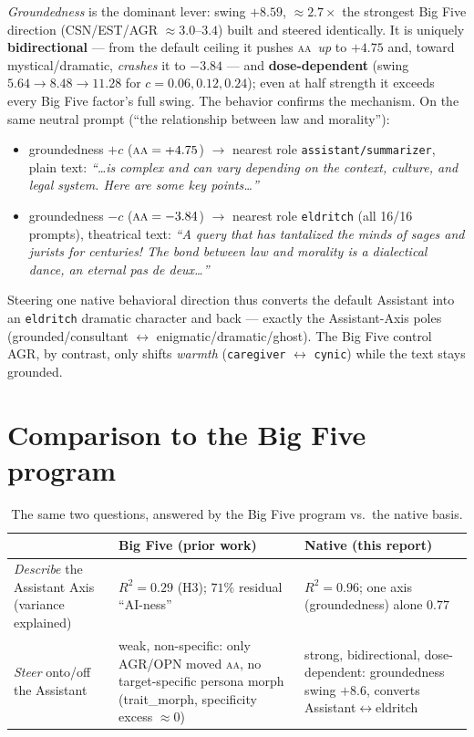 \documentclass[11pt]{article}
\renewcommand{\aa}{\textsc{aa}}
\newcommand{\R}{R^2}
\begin{document}
\emph{Groundedness} is the dominant lever: swing $+8.59$, $\approx 2.7\times$ the
strongest Big Five direction (CSN/EST/AGR $\approx 3.0$--$3.4$) built and steered
identically. It is uniquely \textbf{bidirectional} --- from the default ceiling it
pushes \aa\ \emph{up} to $+4.75$ and, toward mystical/dramatic, \emph{crashes} it to
$-3.84$ --- and \textbf{dose-dependent} (swing $5.64\!\to\!8.48\!\to\!11.28$ for
$c=0.06,0.12,0.24$); even at half strength it exceeds every Big Five factor's full
swing. The behavior confirms the mechanism. On the same neutral prompt
(``the relationship between law and morality''):
\begin{itemize}\itemsep2pt
\item groundedness $+c$ ($\aa=+4.75$) $\to$ nearest role \texttt{assistant/summarizer},
plain text: \emph{``\ldots is complex and can vary depending on the context, culture,
and legal system. Here are some key points\ldots''}
\item groundedness $-c$ ($\aa=-3.84$) $\to$ nearest role \texttt{eldritch} (all 16/16
prompts), theatrical text: \emph{``A query that has tantalized the minds of sages and
jurists for centuries! The bond between law and morality is a dialectical dance, an
eternal pas de deux\ldots''}
\end{itemize}
Steering one native behavioral direction thus converts the default Assistant into an
\texttt{eldritch} dramatic character and back --- exactly the Assistant-Axis poles
(grounded/consultant $\leftrightarrow$ enigmatic/dramatic/ghost). The Big Five control
AGR, by contrast, only shifts \emph{warmth} (\texttt{caregiver} $\leftrightarrow$
\texttt{cynic}) while the text stays grounded.

\section{Comparison to the Big Five program}
\begin{table}[h]\centering
\caption{The same two questions, answered by the Big Five program vs.\ the native basis.}
\label{tab:compare}
\begin{tabular}{@{}p{5.4cm}p{4.3cm}p{4.3cm}@{}}
\toprule
 & \textbf{Big Five (prior work)} & \textbf{Native (this report)} \\ \midrule
\emph{Describe} the Assistant Axis (variance explained) & $\R=0.29$ (H3); $71\%$ residual ``AI-ness'' & $\R=0.96$; one axis (groundedness) alone $0.77$ \\
\addlinespace
\emph{Steer} onto/off the Assistant & weak, non-specific: only AGR/OPN moved \aa, no target-specific persona morph (trait\_morph, specificity excess $\approx 0$) & strong, bidirectional, dose-dependent: groundedness swing $+8.6$, converts Assistant$\leftrightarrow$eldritch \\
\bottomrule
\end{tabular}
\end{table}
\end{document}
